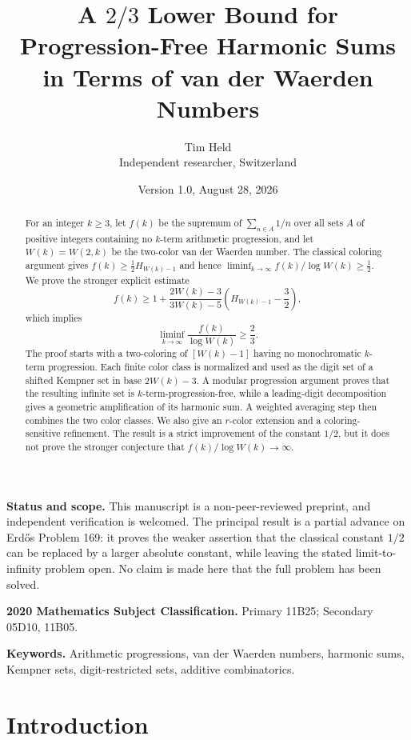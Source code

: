 \documentclass[11pt]{article}
\title{A \texorpdfstring{$2/3$}{2/3} Lower Bound for Progression-Free Harmonic Sums\\
       in Terms of van der Waerden Numbers}
\author{Tim Held\\[2pt]
\small Independent researcher, Switzerland}
\date{Version 1.0, August 28, 2026}
\theoremstyle{definition}
\theoremstyle{remark}
\begin{document}
\maketitle

\begin{abstract}
For an integer $k\ge 3$, let $f(k)$ be the supremum of
$\sum_{n\in A}1/n$ over all sets $A$ of positive integers containing no
$k$-term arithmetic progression, and let $W(k)=W(2,k)$ be the two-color
van der Waerden number.  The classical coloring argument gives
$f(k)\ge \tfrac12 H_{W(k)-1}$ and hence
$\liminf_{k\to\infty} f(k)/\log W(k)\ge \tfrac12$.
We prove the stronger explicit estimate
\[
 f(k)\ge
 1+\frac{2W(k)-3}{3W(k)-5}
 \left(H_{W(k)-1}-\frac32\right),
\]
which implies
\[
 \liminf_{k\to\infty}\frac{f(k)}{\log W(k)}\ge \frac23.
\]
The proof starts with a two-coloring of $[W(k)-1]$ having no
monochromatic $k$-term progression.  Each finite color class is normalized
and used as the digit set of a shifted Kempner set in base $2W(k)-3$.
A modular progression argument proves that the resulting infinite set is
$k$-term-progression-free, while a leading-digit decomposition gives a
geometric amplification of its harmonic sum.  A weighted averaging step
then combines the two color classes.  We also give an $r$-color extension
and a coloring-sensitive refinement.  The result is a strict improvement
of the constant $1/2$, but it does not prove the stronger conjecture that
$f(k)/\log W(k)\to\infty$.
\end{abstract}

\noindent\textbf{Status and scope.}
This manuscript is a non-peer-reviewed preprint, and independent
verification is welcomed.  The principal result is a partial advance on
Erd\H{o}s Problem 169: it proves the weaker assertion that the classical
constant $1/2$ can be replaced by a larger absolute constant, while leaving
the stated limit-to-infinity problem open.  No claim is made here that the
full problem has been solved.

\medskip
\noindent\textbf{2020 Mathematics Subject Classification.}
Primary 11B25; Secondary 05D10, 11B05.

\noindent\textbf{Keywords.}
Arithmetic progressions, van der Waerden numbers, harmonic sums,
Kempner sets, digit-restricted sets, additive combinatorics.

\section{Introduction}
\end{document}
